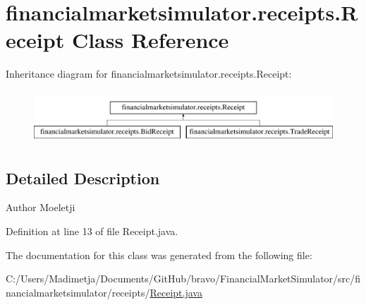 \hypertarget{classfinancialmarketsimulator_1_1receipts_1_1_receipt}{\section{financialmarketsimulator.\+receipts.\+Receipt Class Reference}
\label{classfinancialmarketsimulator_1_1receipts_1_1_receipt}
}
Inheritance diagram for financialmarketsimulator.\+receipts.\+Receipt\+:\begin{figure}[H]
\begin{center}
\leavevmode
\includegraphics[height=1.978799cm]{classfinancialmarketsimulator_1_1receipts_1_1_receipt}
\end{center}
\end{figure}


\subsection{Detailed Description}
\begin{DoxyAuthor}{Author}
Moeletji 
\end{DoxyAuthor}


Definition at line 13 of file Receipt.\+java.



The documentation for this class was generated from the following file\+:\begin{DoxyCompactItemize}
\item 
C\+:/\+Users/\+Madimetja/\+Documents/\+Git\+Hub/bravo/\+Financial\+Market\+Simulator/src/financialmarketsimulator/receipts/\hyperlink{_receipt_8java}{Receipt.\+java}\end{DoxyCompactItemize}
